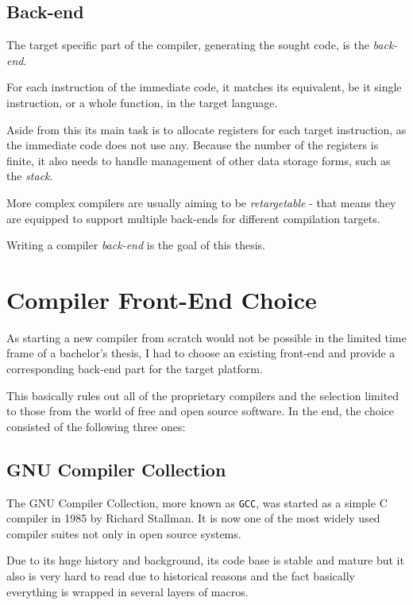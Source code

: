     \section{Back-end}\label{desc_backend}

        The target specific part of the compiler, generating the sought code, is the \emph{back-end}.

        For each instruction of the immediate code, it matches its equivalent, be it single instruction, or a whole function, in the target language.

        Aside from this its main task is to allocate registers for each target instruction, as the immediate code does not use any. Because the number of the registers is finite, it also needs to handle management of other data storage forms, such as the \emph{stack}.

        More complex compilers are usually aiming to be \emph{retargetable} - that means they are equipped to support multiple back-ends for different compilation targets.

        Writing a compiler \emph{back-end} is the goal of this thesis.

\chapter{Compiler Front-End Choice}\label{compiler}

As starting a new compiler from scratch would not be possible in the limited time frame of a bachelor's thesis, I had to choose an existing front-end and provide a corresponding back-end part for the target platform.

This basically rules out all of the proprietary compilers and the selection limited to those from the world of free and open source software. In the end, the choice consisted of the following three ones:


    \section{GNU Compiler Collection}\label{gcc}

    The GNU Compiler Collection, more known as \texttt{GCC}, was started as a simple C compiler in 1985 by Richard Stallman. It is now one of the most widely used compiler suites not only in open source systems.

    Due to its huge history and background, its code base is stable and mature but it also is very hard to read due to historical reasons and the fact basically everything is wrapped in several layers of macros.

